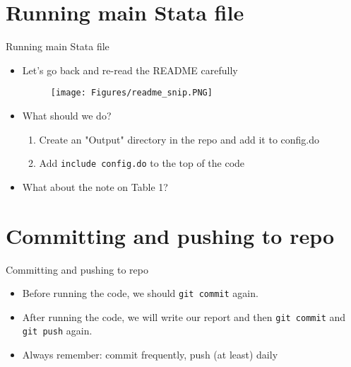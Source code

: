 \documentclass[xcolor={dvipsnames}]{beamer}
\theoremstyle{definition}
\begin{document}
\section{Running main Stata file}
\begin{frame}{Running main Stata file}
\begin{itemize}
    \item Let's go back and re-read the README carefully
    \begin{figure}
        \centering
        \texttt{[image: Figures/readme\_snip.PNG]}
    \end{figure}
    \pause
    \item What should we do?
    \pause
    \begin{enumerate}
        \item Create an "Output" directory in the repo and add it to config.do
        \item Add \texttt{include config.do} to the top of the code
    \end{enumerate}
    \pause
    \item What about the note on Table 1?
\end{itemize}
\end{frame}

\section{Committing and pushing to repo}
\begin{frame}{Committing and pushing to repo}
\begin{itemize}
    \item Before running the code, we should \texttt{git commit} again.
    \item After running the code, we will write our report and then \texttt{git commit} and \texttt{git push} again.
    \item Always remember: commit frequently, push (at least) daily
\end{itemize}
\end{frame}
\end{document}
